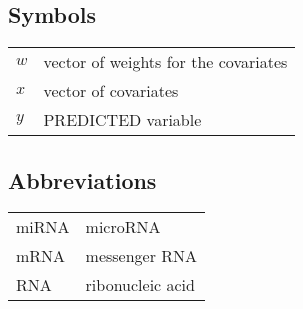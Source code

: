 \documentclass[english,12pt,a4paper,pdftex,elec,utf8]{aaltothesis}
\begin{document}

\subsection*{Symbols}

\begin{tabular}{ll}
$w$ & vector of weights for the covariates \\
$x$ & vector of covariates \\
$y$ & PREDICTED variable
\end{tabular}



\subsection*{Abbreviations}

\begin{tabular}{ll}
miRNA       & microRNA \\
mRNA        & messenger RNA \\
RNA         & ribonucleic acid
\end{tabular}
\end{document}

